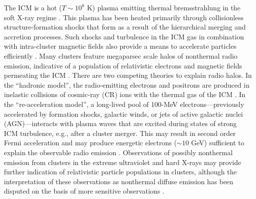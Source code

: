 \documentclass[12pt,manuscript]{aastex}
\begin{document}
The ICM is a hot ($T\sim 10^{8}$ K) plasma emitting thermal bremsstrahlung in the soft X-ray regime
\citep[see, e.g.,][]{article:Petrosian:2001}. This plasma has been heated primarily through
collisionless structure-formation shocks that form as a result of the hierarchical merging and
accretion processes. Such shocks and turbulence in the ICM gas in combination with intra-cluster
magnetic fields also provide a means to accelerate particles efficiently \citep[see,
e.g.,][]{article:ColafrancescoBlasi:1998, article:Ryu_etal:2003}. Many clusters feature megaparsec
scale halos of nonthermal radio emission, indicative of a population of relativistic electrons
and magnetic fields permeating the ICM \citep{article:Cassano_etal:2010}. There are two competing
theories to explain radio halos. In the ``hadronic model'', the radio-emitting
electrons and positrons are produced in inelastic collisions of cosmic-ray (CR) ions with the thermal gas of the
ICM \citep{article:Dennison:1980, article:EnsslinPfrommerMiniatiSubramanian:2011}. In the
``re-acceleration model'', a long-lived pool of 100-MeV electrons---previously accelerated by
formation shocks, galactic winds, or jets of active galactic nuclei (AGN)---interacts with plasma
waves that are excited during states of strong ICM turbulence, e.g., after a cluster merger. This
may result in second order Fermi acceleration and may produce energetic electrons ($\sim 10$ GeV)
sufficient to explain the observable radio emission \citep{article:SchlickeiserSieversThiemann:1987,
article:BrunettiLazarian:2010}. Observations of possibly nonthermal emission from clusters
in the extreme ultraviolet \citep[EUV; ][]{article:SarazinLieu:1998} and hard X-rays
\citep{article:RephaeliGruber:2002, article:Fusco-Femiano_etal:2004, article:Eckert_etal:2007} may
provide further indication of relativistic particle populations in clusters, although the
interpretation of these observations as nonthermal diffuse emission has been disputed on the basis
of more sensitive observations \citep[see, e.g.,][]{article:Ajello_etal:2009,
article:Ajello_etal:2010, article:Wik_etal:2009}.
\end{document}
